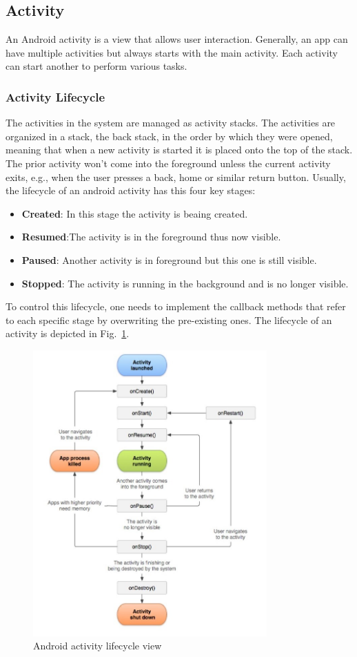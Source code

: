 \subsection{Activity}%
\label{sec:activity}
An Android activity  is a view that allows user interaction. Generally, an app can have multiple activities but always starts with the main activity.
Each activity can start another to perform various tasks.
%
\subsubsection{Activity Lifecycle}%
\label{sec:activity_lifecycle}
The activities in the system are managed as activity stacks. The activities are organized in a stack, the back stack, in the order by which they were opened, meaning that when a new activity is started it is placed onto the top of the stack. The prior activity won't come into the foreground unless the current activity exits, e.g., when the user presses a back, home or similar return button.
%
Usually, the lifecycle of an android activity has this four key stages:
\begin{itemize}%
\item \textbf {Created}: In this stage the activity is beaing created.
\item \textbf {Resumed}:The activity is in the foreground thus now visible.
\item \textbf {Paused}: Another activity is in foreground but this one is still visible.
\item \textbf {Stopped}: The activity is running in the background and is no longer visible.
\end{itemize}
%
To control this lifecycle, one needs to implement the callback methods that refer to each specific stage by overwriting the pre-existing ones. The lifecycle of an activity is depicted in Fig.~\ref{fig:activity_lifecycle}.
%
\begin{figure}[!ht]
\centering
\includegraphics[width=0.8\textwidth]{img/activity_lifecycle.png}
\caption{\label{fig:activity_lifecycle}Android activity lifecycle
view }
\end{figure}
